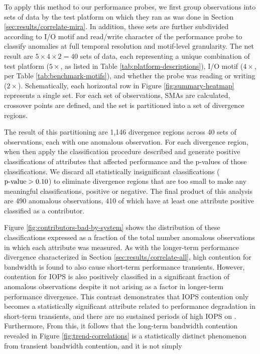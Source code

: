 To apply this method to our performance probes, we first group observations into sets of data by the test platform on which they ran as was done in Section \ref{sec:results/correlate-mira}.
In addition, these sets are further subdivided according to I/O motif and read/write character of the performance probe to classify anomalies at full temporal resolution and motif-level granularity.
The net result are $5 \times 4 \times 2 = 40$ sets of data, each representing a unique combination of test platform ($5 \times$, as listed in Table \ref{tab:platform-descriptions}), I/O motif ($4 \times$, per Table \ref{tab:benchmark-motifs}), and whether the probe was reading or writing ($2 \times$).
Schematically, each horizontal row in Figure \ref{fig:summary-heatmap} represents a single set.
For each set of observations, SMAs are calculated, crossover points are defined, and the set is partitioned into a set of divergence regions.

The result of this partitioning are 1,146 divergence regions across 40 sets of observations, each with one anomalous observation.
For each divergence region, when then apply the classification procedure described and generate positive classifications of attributes that affected performance and the p-values of those classifications.
We discard all statistically insignificant classifications ($\textup{p-value} > 0.10$) to eliminate divergence regions that are too small to make any meaningful classifications, positive or negative.
The final product of this analysis are 490 anomalous observations, 410 of which have at least one attribute positive classified as a contributor.

Figure \ref{fig:contributors-bad-by-system} shows the distribution of these classifications expressed as a fraction of the total number anomalous observations in which each attribute was measured.
As with the longer-term performance divergence characterized in Section \ref{sec:results/correlate-all}, high contention for bandwidth is found to also cause short-term performance transients.
However, contention for IOPS is also positively classified in a significant fraction of anomalous observations despite it not arising as a factor in longer-term performance divergence.
This contrast demonstrates that IOPS contention only becomes a statistically significant attribute related to performance degradation in short-term transients, and there are no sustained periods of high IOPS on \mirafsone.
Furthermore, 
From this, it follows that the long-term bandwidth contention revealed in Figure \ref{fig:trend-correlations} is a statistically distinct phenomenon from transient bandwidth contention, and it is not simply 

